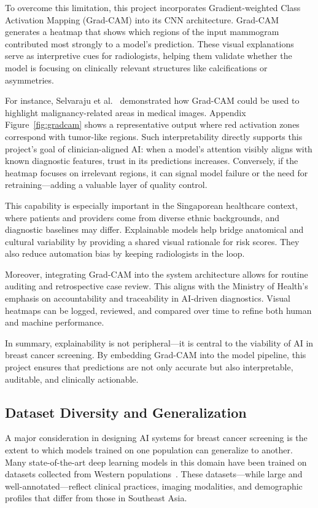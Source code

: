 \documentclass[12pt]{article}
\begin{document}
To overcome this limitation, this project incorporates Gradient-weighted Class Activation Mapping (Grad-CAM) into its CNN architecture. Grad-CAM generates a heatmap that shows which regions of the input mammogram contributed most strongly to a model’s prediction. These visual explanations serve as interpretive cues for radiologists, helping them validate whether the model is focusing on clinically relevant structures like calcifications or asymmetries.

For instance, Selvaraju et al.~\cite{5} demonstrated how Grad-CAM could be used to highlight malignancy-related areas in medical images. Appendix Figure~\ref{fig:gradcam} shows a representative output where red activation zones correspond with tumor-like regions. Such interpretability directly supports this project’s goal of clinician-aligned AI: when a model’s attention visibly aligns with known diagnostic features, trust in its predictions increases. Conversely, if the heatmap focuses on irrelevant regions, it can signal model failure or the need for retraining—adding a valuable layer of quality control.

This capability is especially important in the Singaporean healthcare context, where patients and providers come from diverse ethnic backgrounds, and diagnostic baselines may differ. Explainable models help bridge anatomical and cultural variability by providing a shared visual rationale for risk scores. They also reduce automation bias by keeping radiologists in the loop.

Moreover, integrating Grad-CAM into the system architecture allows for routine auditing and retrospective case review. This aligns with the Ministry of Health’s emphasis on accountability and traceability in AI-driven diagnostics. Visual heatmaps can be logged, reviewed, and compared over time to refine both human and machine performance.

In summary, explainability is not peripheral—it is central to the viability of AI in breast cancer screening. By embedding Grad-CAM into the model pipeline, this project ensures that predictions are not only accurate but also interpretable, auditable, and clinically actionable.

\subsection{Dataset Diversity and Generalization}

A major consideration in designing AI systems for breast cancer screening is the extent to which models trained on one population can generalize to another. Many state-of-the-art deep learning models in this domain have been trained on datasets collected from Western populations~\cite{1}. These datasets—while large and well-annotated—reflect clinical practices, imaging modalities, and demographic profiles that differ from those in Southeast Asia.
\end{document}
